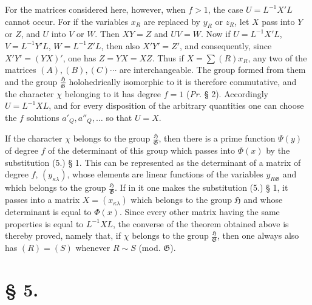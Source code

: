 \documentclass[11pt]{article}
\newcommand{\Hgrp}{\mathfrak{H}}
\newcommand{\Ggrp}{\mathfrak{G}}
\begin{document}
For the matrices considered here, however, when $f>1$, the case $U=L^{-1}X'L$ cannot occur. For if the variables $x_R$ are replaced by $y_R$ or $z_R$, let $X$ pass into $Y$ or $Z$, and $U$ into $V$ or $W$. Then $XY=Z$ and $UV=W$. Now if $U=L^{-1}X'L$, $V=L^{-1}Y'L$, $W=L^{-1}Z'L$, then also $X'Y'=Z'$, and consequently, since $X'Y'=(YX)'$, one has $Z=YX=XZ$. Thus if $X=\sum(R)x_R$, any two of the matrices $(A),(B),(C)\cdots$ are interchangeable. The group formed from them and the group $\frac{\Hgrp}{\Ggrp}$ holohedrically isomorphic to it is therefore commutative, and the character $\chi$ belonging to it has degree $f=1$ (\emph{Pr.} § 2). Accordingly $U=L^{-1}XL$, and for every disposition of the arbitrary quantities one can choose the $f$ solutions $a'_Q,a''_Q,\ldots$ so that $U=X$.

If the character $\chi$ belongs to the group $\frac{\Hgrp}{\Ggrp}$, then there is a prime function $\Psi(y)$ of degree $f$ of the determinant of this group which passes into $\Phi(x)$ by the substitution (5.) § 1. This can be represented as the determinant of a matrix of degree $f$, $(y_{\kappa\lambda})$, whose elements are linear functions of the variables $y_{R\Ggrp}$ and which belongs to the group $\frac{\Hgrp}{\Ggrp}$. If in it one makes the substitution (5.) § 1, it passes into a matrix $X=(x_{\kappa\lambda})$ which belongs to the group $\Hgrp$ and whose determinant is equal to $\Phi(x)$. Since every other matrix having the same properties is equal to $L^{-1}XL$, the converse of the theorem obtained above is thereby proved, namely that, if $\chi$ belongs to the group $\frac{\Hgrp}{\Ggrp}$, then one always also has $(R)=(S)$ whenever $R\sim S$ (mod. $\Ggrp$).

\section*{§ 5.}
\end{document}
